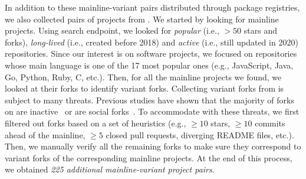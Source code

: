 In addition to these mainline-variant pairs distributed through package registries, we also collected pairs of projects from \gh.
We started by looking for mainline projects.
Using \gh search endpoint, we looked for \emph{popular} (i.e., $>50$ stars and forks), \emph{long-lived} (i.e., created before 2018) and \emph{active} (i.e., still updated in 2020) repositories. Since our interest is on software projects, we focused on repositories whose main language is one of the 17 most popular ones (e.g., \textsf{JavaScript, Java, Go, Python, Ruby, C}, etc.). 
Then, for all the mainline projects we found, we looked at their forks to identify variant forks. Collecting variant forks from \gh is subject to many threats. Previous studies have shown that the majority of forks on \gh are inactive~\cite{Businge:Android:2019,Businge:2017} or are social forks~\cite{businge:2018icsme}.
To accommodate with these threats, we first filtered out forks based on a set of heuristics (e.g., $\geq 10$ stars, $\geq 10$ commits ahead of the mainline, $\geq 5$ closed pull requests, diverging \textsf{README} files, etc.).
Then, we manually verify all the remaining forks to make sure they correspond to variant forks of the corresponding mainline projects.
At the end of this process, we obtained \textit{225 additional mainline-variant project pairs}.

